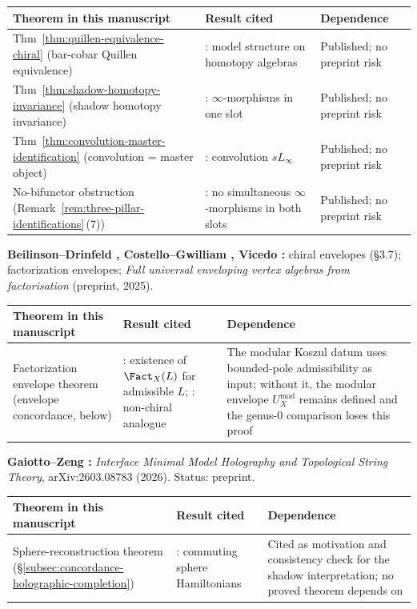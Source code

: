 \begin{remark}
\smallskip
\renewcommand{\arraystretch}{1.25}
\noindent
\begin{tabular}{p{4.8cm}p{4.2cm}p{5.5cm}}
\textbf{Theorem in this manuscript}
 & \textbf{Result cited}
 & \textbf{Dependence} \\
\hline
Thm~\ref{thm:quillen-equivalence-chiral}
 (bar-cobar Quillen equivalence)
 & \cite[Thm~2.1]{Val16}: model structure on
 homotopy algebras
 & Published; no preprint risk \\
Thm~\ref{thm:shadow-homotopy-invariance}
 (shadow homotopy invariance)
 & \cite[Thm~5.1]{RNW19}: $\infty$-morphisms
 in one slot
 & Published; no preprint risk \\
Thm~\ref{thm:convolution-master-identification}
 (convolution = master object)
 & \cite[Thm~4.1]{RNW19}: convolution $sL_\infty$
 & Published; no preprint risk \\
No-bifunctor obstruction
 (Remark~\ref{rem:three-pillar-identifications}\,(7))
 & \cite[Thm~6.6]{RNW19}: no simultaneous
 $\infty$-morphisms in both slots
 & Published; no preprint risk
\end{tabular}

\medskip
\noindent\textbf{Beilinson--Drinfeld \cite{BD04}, Costello--Gwilliam
\cite{CG17}, Vicedo \cite{Vic25}:}
chiral envelopes \textup{(\S3.7)}; factorization envelopes;
\emph{Full universal enveloping vertex algebras
from factorisation} (preprint, 2025).

\smallskip
\renewcommand{\arraystretch}{1.25}
\noindent
\begin{tabular}{p{4.8cm}p{4.2cm}p{5.5cm}}
\textbf{Theorem in this manuscript}
 & \textbf{Result cited}
 & \textbf{Dependence} \\
\hline
Factorization envelope theorem
 (envelope concordance, below)
 & \cite[\S3.7]{BD04}: existence of $\Fact_X(L)$ for
 admissible $L$; \cite{Vic25}: non-chiral
 analogue
 & The modular Koszul datum uses bounded-pole
 admissibility as input; without it, the modular
 envelope $U^{\mathrm{mod}}_X$ remains defined
 and the genus-$0$ comparison loses this proof
\end{tabular}

\medskip
\noindent\textbf{Gaiotto--Zeng \cite{GZ26}:}
\emph{Interface Minimal Model Holography and Topological String
Theory}, arXiv:2603.08783 (2026). Status: preprint.

\smallskip
\renewcommand{\arraystretch}{1.25}
\noindent
\begin{tabular}{p{4.8cm}p{4.2cm}p{5.5cm}}
\textbf{Theorem in this manuscript}
 & \textbf{Result cited}
 & \textbf{Dependence} \\
\hline
Sphere-reconstruction theorem
 (\S\ref{subsec:concordance-holographic-completion})
 & \cite{GZ26}: commuting sphere Hamiltonians
 & Cited as motivation and consistency check for the
 shadow interpretation; no proved theorem depends
 on \cite{GZ26}
\end{tabular}


\end{remark}
